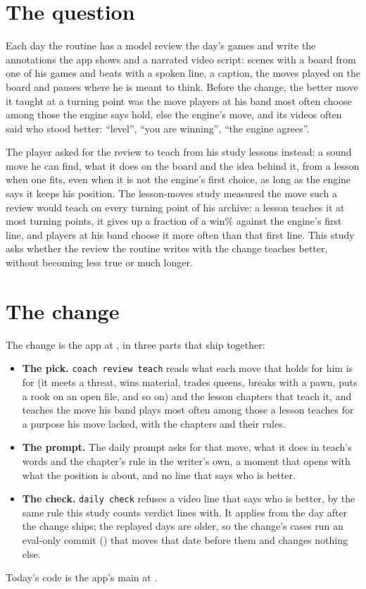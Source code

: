 \documentclass[11pt]{article}
\begin{document}
\section{The question}

Each day the routine has a model review the day's games and write the annotations the app shows
and a narrated video script: scenes with a board from one of his games and beats with a spoken
line, a caption, the moves played on the board and pauses where he is meant to think. Before the
change, the better move it taught at a turning point was the move players at his band most often
choose among those the engine says hold, else the engine's move, and its videos often said who
stood better: ``level'', ``you are winning'', ``the engine agrees''.

The player asked for the review to teach from his study lessons instead: a sound move he can find,
what it does on the board and the idea behind it, from a lesson when one fits, even when it is not
the engine's first choice, as long as the engine says it keeps his position. The lesson-moves
study measured the move such a review would teach on every turning point of his archive: a lesson
teaches it at most turning points, it gives up a fraction of a win\% against the engine's first
line, and players at his band choose it more often than that first line. This study asks whether
the review the routine writes with the change teaches better, without becoming less true or much
longer.

\section{The change}

The change is the app at \texttt{\ChangeCommit}, in three parts that ship together:
\begin{itemize}[nosep]
\item \textbf{The pick.} \texttt{coach review teach} reads what each move that holds for him is for
  (it meets a threat, wins material, trades queens, breaks with a pawn, puts a rook on an open file,
  and so on) and the lesson chapters that teach it, and teaches the move his band plays most often
  among those a lesson teaches for a purpose his move lacked, with the chapters and their rules.
\item \textbf{The prompt.} The daily prompt asks for that move, what it does in teach's words and
  the chapter's rule in the writer's own, a moment that opens with what the position is about, and
  no line that says who is better.
\item \textbf{The check.} \texttt{daily check} refuses a video line that says who is better, by the
  same rule this study counts verdict lines with. It applies from the day after the change ships;
  the replayed days are older, so the change's cases run an eval-only commit
  (\texttt{\CandCommit}) that moves that date before them and changes nothing else.
\end{itemize}
Today's code is the app's main at \texttt{\BaseCommit}.
\end{document}
